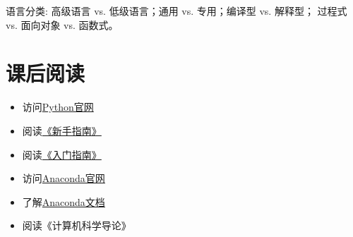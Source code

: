 语言分类: 高级语言 vs. 低级语言；通用 vs. 专用；编译型 vs. 解释型； 过程式 vs. 面向对象 vs. 函数式。

\section{课后阅读}
\begin{itemize}
\item 访问\href{https://www.python.org}{Python官网}
\item 阅读\href{https://wiki.python.org/moin/BeginnersGuide}{《新手指南》}
\item 阅读\href{https://docs.python.org/3/tutorial/}{《入门指南》}
\item 访问\href{http://www.anaconda.com}{Anaconda官网}
\item 了解\href{https://docs.anaconda.com/}{Anaconda文档}
\item 阅读《计算机科学导论》
\end{itemize}
